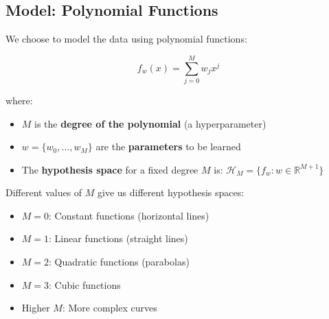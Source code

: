 \documentclass[11pt,a4paper]{article}
\theoremstyle{definition}
\theoremstyle{plain}
\theoremstyle{remark}
\begin{document}
\subsection{Model: Polynomial Functions}

We choose to model the data using polynomial functions:

\[
f_w(x) = \sum_{j=0}^{M} w_j x^j
\]

where:
\begin{itemize}
    \item $M$ is the \textbf{degree of the polynomial} (a hyperparameter)
    \item $w = \{w_0, \ldots, w_M\}$ are the \textbf{parameters} to be learned
    \item The \textbf{hypothesis space} for a fixed degree $M$ is: $\mathcal{H}_M = \{f_w : w \in \mathbb{R}^{M+1}\}$
\end{itemize}

Different values of $M$ give us different hypothesis spaces:
\begin{itemize}
    \item $M = 0$: Constant functions (horizontal lines)
    \item $M = 1$: Linear functions (straight lines)
    \item $M = 2$: Quadratic functions (parabolas)
    \item $M = 3$: Cubic functions
    \item Higher $M$: More complex curves
\end{itemize}
\end{document}
